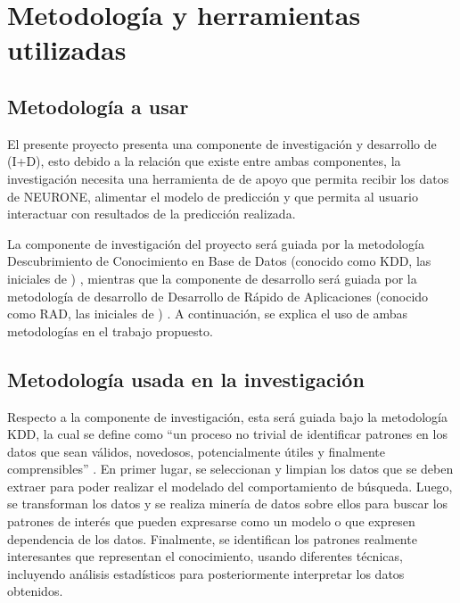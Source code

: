 \section{Metodología y herramientas utilizadas}
\label{sec:metodologia-herramientas}


\subsection{Metodología a usar}
\label{subsec:metodologia}

El presente proyecto presenta una componente de investigación y desarrollo de  (I+D), esto debido a la relación que existe entre ambas componentes, la investigación necesita una herramienta de  de apoyo que permita recibir los datos de NEURONE, alimentar el modelo de predicción y que permita al usuario interactuar con resultados de la predicción realizada.

La componente de investigación del proyecto será guiada por la metodología Descubrimiento de Conocimiento en Base de Datos (conocido como KDD, las iniciales de ) \parencite{fayyad1996data}, mientras que la componente de desarrollo será guiada por la metodología de desarrollo de  Desarrollo de Rápido de Aplicaciones (conocido como RAD, las iniciales de ) \parencite{martin1991rapid}. A continuación, se explica el uso de ambas metodologías en el trabajo propuesto.

\subsection*{Metodología usada en la investigación}
Respecto a la componente de investigación, esta será guiada bajo la metodología KDD, la cual se define como “un proceso no trivial de identificar patrones en los datos que sean válidos, novedosos, potencialmente útiles y finalmente comprensibles” \parencite[p.~5]{fayyad1996data}. En primer lugar, se seleccionan y limpian los datos que se deben extraer para poder realizar el modelado del comportamiento de búsqueda. Luego, se transforman los datos y se realiza minería de datos sobre ellos para buscar los patrones de interés que pueden expresarse como un modelo o que expresen dependencia de los datos. Finalmente, se identifican los patrones realmente interesantes que representan el conocimiento, usando diferentes técnicas, incluyendo análisis estadísticos para posteriormente interpretar los datos obtenidos.


